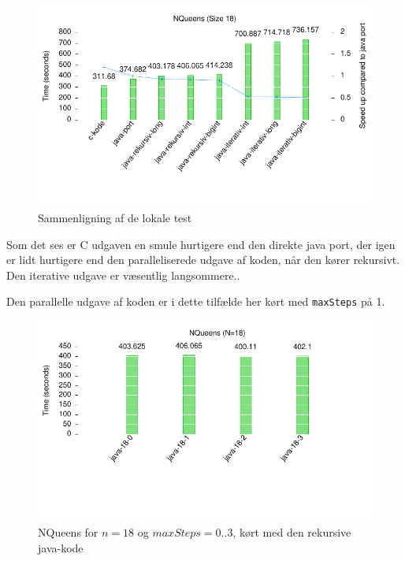 \begin{figure}[h]
\begin{center}
\includegraphics{../benchmarks/lokal.pdf}
\caption{Sammenligning af de lokale test} 
\label{figur:lokal}
\end{center}
\end{figure}

Som det ses er C udgaven en smule hurtigere end den direkte java port, der igen
er lidt hurtigere end den paralleliserede udgave af koden, når den kører
rekursivt. Den iterative udgave er væsentlig langsommere..

Den parallelle udgave af koden er i dette tilfælde her kørt med
\texttt{maxSteps} på 1. 

\begin{figure}[h]
\begin{center}
\includegraphics{../benchmarks/maxsteps.pdf}
\caption{NQueens for $n=18$ og $maxSteps=0..3$, kørt med den rekursive java-kode} 
\label{figur:maxsteps}
\end{center}
\end{figure}

